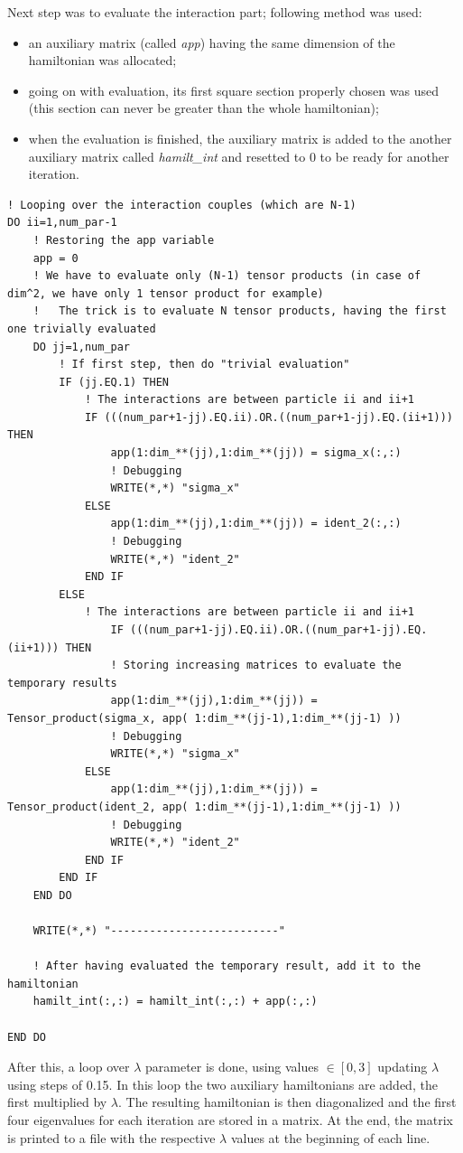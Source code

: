 \documentclass[12pt, a4paper, notitlepage]{report}
\begin{document}
Next step was to evaluate the interaction part; following method was used:
\begin{itemize}
	\item an auxiliary matrix (called \textit{app}) having the same dimension of the hamiltonian was allocated;
	
	\item going on with evaluation, its first square section properly chosen was used (this section can never be greater than the whole hamiltonian);
	
	\item when the evaluation is finished, the auxiliary matrix is added to the another auxiliary matrix called \textit{hamilt\_int} and resetted to 0 to be ready for another iteration.
\end{itemize}

\begin{lstlisting}
! Looping over the interaction couples (which are N-1)
DO ii=1,num_par-1
	! Restoring the app variable
	app = 0
	! We have to evaluate only (N-1) tensor products (in case of dim^2, we have only 1 tensor product for example)
	!	The trick is to evaluate N tensor products, having the first one trivially evaluated
	DO jj=1,num_par
		! If first step, then do "trivial evaluation"
		IF (jj.EQ.1) THEN
			! The interactions are between particle ii and ii+1
			IF (((num_par+1-jj).EQ.ii).OR.((num_par+1-jj).EQ.(ii+1))) THEN
				app(1:dim_**(jj),1:dim_**(jj)) = sigma_x(:,:)
				! Debugging
				WRITE(*,*) "sigma_x"
			ELSE
				app(1:dim_**(jj),1:dim_**(jj)) = ident_2(:,:)
				! Debugging
				WRITE(*,*) "ident_2"
			END IF
		ELSE
			! The interactions are between particle ii and ii+1
				IF (((num_par+1-jj).EQ.ii).OR.((num_par+1-jj).EQ.(ii+1))) THEN
				! Storing increasing matrices to evaluate the temporary results
				app(1:dim_**(jj),1:dim_**(jj)) = Tensor_product(sigma_x, app( 1:dim_**(jj-1),1:dim_**(jj-1) ))
				! Debugging
				WRITE(*,*) "sigma_x"
			ELSE
				app(1:dim_**(jj),1:dim_**(jj)) = Tensor_product(ident_2, app( 1:dim_**(jj-1),1:dim_**(jj-1) ))
				! Debugging
				WRITE(*,*) "ident_2"
			END IF
		END IF
	END DO
	
	WRITE(*,*) "--------------------------"
	
	! After having evaluated the temporary result, add it to the hamiltonian
	hamilt_int(:,:) = hamilt_int(:,:) + app(:,:)

END DO
\end{lstlisting}

After this, a loop over $\lambda$ parameter is done, using values $\in [0,3]$ updating $\lambda$ using steps of 0.15. In this loop the two auxiliary hamiltonians are added, the first multiplied by $\lambda$. The resulting hamiltonian is then diagonalized and the first four eigenvalues for each iteration are stored in a matrix.
At the end, the matrix is printed to a file with the respective $\lambda$ values at the beginning of each line.
\end{document}
